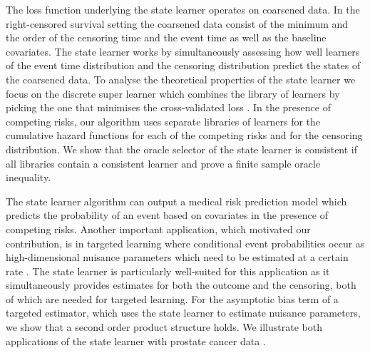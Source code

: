 The loss function underlying the state learner operates on coarsened data. In
the right-censored survival setting the coarsened data consist of the minimum
and the order of the censoring time and the event time as well as the baseline
covariates. The state learner works by simultaneously assessing how well
learners of the event time distribution and the censoring distribution predict
the states of the coarsened data. To analyse the theoretical properties of the
state learner we focus on the discrete super learner which combines the library
of learners by picking the one that minimises the cross-validated loss
\citep{van2007super}. In the presence of competing risks, our algorithm uses
separate libraries of learners for the cumulative hazard functions for each of
the competing risks and for the censoring distribution. We show that the oracle
selector of the state learner is consistent if all libraries contain a
consistent learner and prove a finite sample oracle inequality.

The state learner algorithm can output a medical risk prediction model
\citep{gerds2021medical} which predicts the probability of an event based on
covariates in the presence of competing risks. Another important application,
which motivated our contribution, is in targeted learning where conditional
event probabilities occur as high-dimensional nuisance parameters which need to
be estimated at a certain rate \citep{van2011targeted, rytgaard2021estimation,
  rytgaard2022targeted}. The state learner is particularly well-suited for this
application as it simultaneously provides estimates for both the outcome and the
censoring, both of which are needed for targeted learning. For the asymptotic
bias term of a targeted estimator, which uses the state learner to estimate
nuisance parameters, we show that a second order product structure holds. We
illustrate both applications of the state learner with prostate cancer data
\citep{kattan2000pretreatment}.

